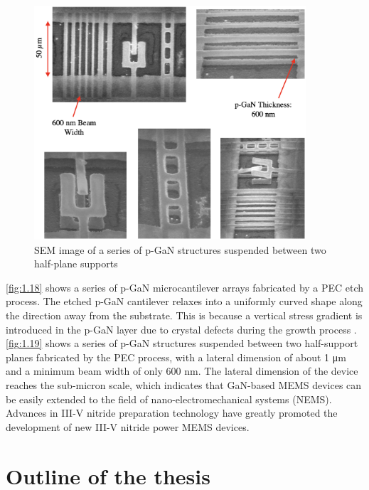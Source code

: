 \begin{figure}[H] 
\centering    
\includegraphics[width=0.9\textwidth]{ch1_19}
\caption[SEM image of a series of p-GaN structures suspended between two half-plane supports]{SEM image of a series of p-GaN structures suspended between two half-plane supports \protect\cite{strittmatter2004development}}
\label{fig:1.19}
\end{figure}

\autoref{fig:1.18} shows a series of p-GaN microcantilever arrays fabricated by a PEC etch process. The etched p-GaN cantilever  relaxes into a uniformly curved shape along the direction away from the  substrate. This is because a vertical stress gradient is introduced in the p-GaN layer due to crystal  defects during the growth process \cite{strittmatter2004development}. \autoref{fig:1.19} shows a series of p-GaN structures suspended between two half-support planes fabricated by the PEC process, with a lateral dimension of about 1 \unit{\um} and a minimum beam width of only 600 \unit{\nm}. The lateral dimension of the device reaches the sub-micron scale, which indicates that GaN-based MEMS devices can be easily extended to the field of nano-electromechanical systems (NEMS). Advances in III-V nitride  preparation technology have greatly promoted the development of new III-V nitride power MEMS  devices.

\section{Outline of the thesis} 

